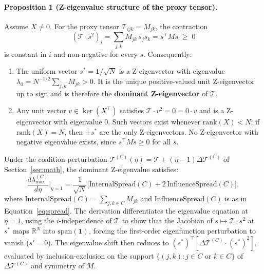 \documentclass[11pt]{article}
\begin{document}
\paragraph{Proposition 1 (Z-eigenvalue structure of the proxy tensor).}
Assume $X \neq 0$. For the proxy tensor $\mathcal{T}_{ijk} = M_{jk}$, the contraction
\[
(\mathcal{T} \cdot s^2)_i = \sum_{j,k} M_{jk}\,s_j s_k = s^\top M s \;\geq\; 0
\]
is constant in $i$ and non-negative for every $s$. Consequently:
\begin{enumerate}
\item The uniform vector $s^* = \mathbf{1}/\sqrt{N}$ is a Z-eigenvector with eigenvalue $\lambda_0 = N^{-1/2}\sum_{j,k}M_{jk} > 0$.
It is the unique positive-valued unit Z-eigenvector up to sign and is therefore the \textbf{dominant Z-eigenvector} of $\mathcal{T}$.
\item Any unit vector $v \in \ker(X^\top)$ satisfies $\mathcal{T}\cdot v^2 = 0 = 0\cdot v$ and is a Z-eigenvector with eigenvalue $0$.
Such vectors exist whenever $\mathrm{rank}(X) < N$; if $\mathrm{rank}(X) = N$, then $\pm s^*$ are the only Z-eigenvectors.
No Z-eigenvector with negative eigenvalue exists, since $s^\top M s \geq 0$ for all $s$.
\end{enumerate}
Under the coalition perturbation $\mathcal{T}^{(C)}(\eta) = \mathcal{T} + (\eta-1)\Delta\mathcal{T}^{(C)}$ of Section~\ref{sec:math}, the dominant Z-eigenvalue satisfies:
\begin{equation}
    \frac{d\lambda_{\max}^{(C)}}{d\eta}\bigg|_{\eta=1} = \frac{1}{\sqrt{N}}\bigl[\mathrm{InternalSpread}(C) + 2\,\mathrm{InfluenceSpread}(C)\bigr],
    \label{eq:eigenvalue_sensitivity}
\end{equation}
where $\mathrm{InternalSpread}(C) = \sum_{j,k \in C} M_{jk}$ and $\mathrm{InfluenceSpread}(C)$ is as in Equation~\eqref{eq:spread}. The derivation differentiates the eigenvalue equation at $\eta=1$, using the $i$-independence of $\mathcal{T}$ to show that the Jacobian of $s \mapsto \mathcal{T}\cdot s^2$ at $s^*$ maps $\mathbb{R}^N$ into $\mathrm{span}(\mathbf{1})$, forcing the first-order eigenfunction perturbation to vanish ($s' = 0$). The eigenvalue shift then reduces to $(s^*)^\top[\Delta\mathcal{T}^{(C)}\cdot(s^*)^2]$, evaluated by inclusion-exclusion on the support $\{(j,k) : j \in C \text{ or } k \in C\}$ of $\Delta\mathcal{T}^{(C)}$ and symmetry of $M$.
\end{document}
